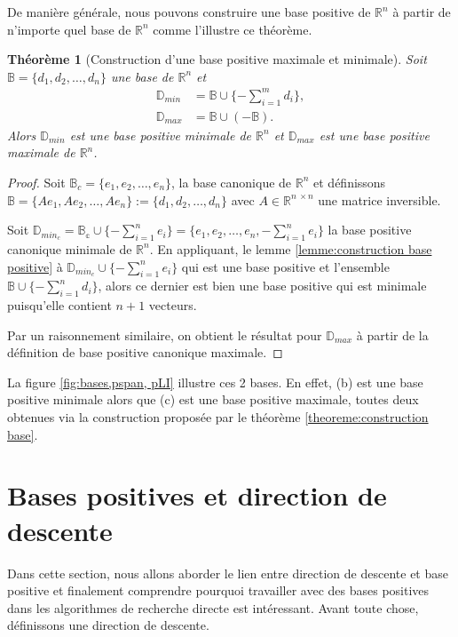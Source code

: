 \documentclass[french]{report}
\newtheorem{thm}{Théorème}[section]
\newcommand{\theoreme}[2]{\begin{thm}[#1] #2\end{thm}}
\newcommand{\preuve}[1]{\begin{proof} #1 \end{proof}}
\newcommand{\D}{\mathbb{D}}
\begin{document}
De manière générale, nous pouvons construire une base positive de $\mathbb{R}^n$ à partir de n'importe quel base de $\mathbb{R}^n$ comme l'illustre ce théorème.


\theoreme{Construction d'une base positive maximale et minimale}
{
    Soit $\mathbb{B} = \{ d_1,d_2,\dots,d_n \}$ une base de $\mathbb{R}^n$ et
    \begin{align*}
        \mathbb{D}_{min} & = \mathbb{B} \cup \{ -\sum_{i=1}^m d_i \}, \\
        \mathbb{D}_{max} & = \mathbb{B} \cup (-\mathbb{B}).
    \end{align*}
    Alors $\D_{min}$ est une base positive minimale de $\mathbb{R}^n$ et $\D_{max}$ est une base positive maximale de $\mathbb{R}^n$.
}\label{theoreme:construction base}
\preuve
{
    Soit $\mathbb{B}_c = \{e_1,e_2,\dots,e_n\}$, la base canonique de $\mathbb{R}^n$ et définissons $\mathbb{B} = \{A e_1,A e_2,\dots,A e_n\} := \{ d_1,d_2,\dots, d_n \} $ avec $A \in \mathbb{R}^{n\ \times n}$ une matrice inversible.

    Soit $\D_{min_{c}} = \mathbb{B_c} \cup \{-\sum_{i=1}^n e_i \} = \{ e_1,e_2,\dots,e_n,-\sum_{i=1}^n e_i \}$ la base positive canonique minimale de $\mathbb{R}^n$.
    En appliquant, le lemme \ref{lemme:construction base positive} à $\D_{min_c} \cup \{-\sum_{i=1}^n e_i \}$ qui est une base positive et l'ensemble $\mathbb{B} \cup \{-\sum_{i=1}^n d_i \}$, alors ce dernier est bien une base positive qui est minimale puisqu'elle contient $n+1$ vecteurs.

    Par un raisonnement similaire, on obtient le résultat pour $\D_{max}$ à partir de la définition de base positive canonique maximale.
}

La figure \ref{fig:bases,pspan, pLI} illustre ces 2 bases. En effet, (b) est une base positive minimale alors que (c) est une base positive maximale, toutes deux obtenues via la construction proposée par le théorème \ref{theoreme:construction base}.

\section{Bases positives et direction de descente}

Dans cette section, nous allons aborder le lien entre direction de descente et base positive et finalement comprendre pourquoi travailler avec des bases positives dans les algorithmes de recherche directe est intéressant. Avant toute chose, définissons une direction de descente.
\end{document}

